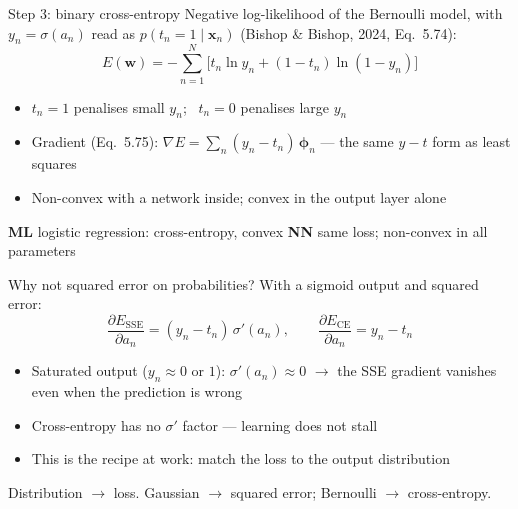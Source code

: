 \documentclass[aspectratio=169, 11pt]{beamer}
\newcommand{\mlparallel}[2]{%
  \vfill
  {\footnotesize
  \begin{tcolorbox}[enhanced, sidebyside, sidebyside align=top,
                    lefthand ratio=0.485,
                    segmentation style={mlc!35, line width=0.6pt},
                    colback=mlc!5, colframe=mlc!35, boxrule=0.5pt,
                    arc=1.5mm, left=2mm, right=2mm, top=0.8mm, bottom=0.8mm]
    {\color{mlc}\textbf{ML}}\;\; #1
  \tcblower
    {\color{nnc}\textbf{NN}}\;\; #2
  \end{tcolorbox}}%
  \vspace{0.6em}%
}
\begin{document}
\begin{frame}{Step 3: binary cross-entropy}
  Negative log-likelihood of the Bernoulli model, with
  $y_n=\sigma(a_n)$ read as
  $p(t_n{=}1\mid\mathbf{x}_n)$
  (Bishop \& Bishop, 2024, Eq.~5.74):
  \[
    E(\mathbf{w}) = -\sum_{n=1}^{N}\Big[
      t_n\ln y_n + (1-t_n)\ln(1-y_n)\Big]
  \]
  \vspace{-0.5em}
  \begin{itemize}\setlength{\itemsep}{0pt}
    \item $t_n{=}1$ penalises small $y_n$; \
          $t_n{=}0$ penalises large $y_n$
    \item Gradient (Eq.~5.75):
          $\nabla E = \sum_n (y_n - t_n)\,
          \boldsymbol{\phi}_n$ --- the
          \alert{same $y-t$ form} as least squares
    \item Non-convex with a network inside; convex in
          the output layer alone
  \end{itemize}
  \mlparallel{logistic regression: cross-entropy,
              convex}
             {same loss; non-convex in all parameters}
\end{frame}

\begin{frame}{Why not squared error on probabilities?}
  With a sigmoid output and squared error:
  \[
    \frac{\partial E_{\mathrm{SSE}}}{\partial a_n}
    = (y_n - t_n)\,\sigma'(a_n),
    \qquad
    \frac{\partial E_{\mathrm{CE}}}{\partial a_n}
    = y_n - t_n
  \]
  \vspace{-0.2em}
  \begin{itemize}\setlength{\itemsep}{1pt}
    \item Saturated output ($y_n\!\approx\!0$ or $1$):
          $\sigma'(a_n)\approx 0$ $\to$ the SSE
          \alert{gradient vanishes} even when the
          prediction is wrong
    \item Cross-entropy has no $\sigma'$ factor ---
          learning does not stall
    \item This is the recipe at work: \alert{match the
          loss to the output distribution}
  \end{itemize}
  \vspace{0.3em}
  \begin{redhighlight}
    Distribution $\to$ loss. Gaussian $\to$ squared
    error; Bernoulli $\to$ cross-entropy.
  \end{redhighlight}
\end{frame}

\end{document}
